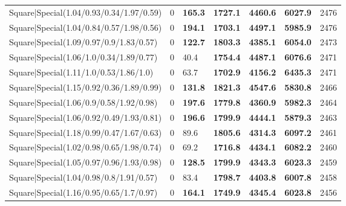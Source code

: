 \begin{tabular}{lrllllr}
 Square|Special(1.04/0.93/0.34/1.97/0.59)                      &             0   & \textbf{165.3} & \textbf{1727.1} & \textbf{4460.6} & \textbf{6027.9} &         2476 \\
 Square|Special(1.04/0.84/0.57/1.98/0.56)                      &             0   & \textbf{194.1} & \textbf{1703.1} & \textbf{4497.1} & \textbf{5985.9} &         2476 \\
 Square|Special(1.09/0.97/0.9/1.83/0.57)                       &             0   & \textbf{122.7} & \textbf{1803.3} & \textbf{4385.1} & \textbf{6054.0} &         2473 \\
 Square|Special(1.06/1.0/0.34/1.89/0.77)                       &             0   & 40.4           & \textbf{1754.4} & \textbf{4487.1} & \textbf{6076.6} &         2471 \\
 Square|Special(1.11/1.0/0.53/1.86/1.0)                        &             0   & 63.7           & \textbf{1702.9} & \textbf{4156.2} & \textbf{6435.3} &         2471 \\
 Square|Special(1.15/0.92/0.36/1.89/0.99)                      &             0   & \textbf{131.8} & \textbf{1821.3} & \textbf{4547.6} & \textbf{5830.8} &         2466 \\
 Square|Special(1.06/0.9/0.58/1.92/0.98)                       &             0   & \textbf{197.6} & \textbf{1779.8} & \textbf{4360.9} & \textbf{5982.3} &         2464 \\
 Square|Special(1.06/0.92/0.49/1.93/0.81)                      &             0   & \textbf{196.6} & \textbf{1799.9} & \textbf{4444.1} & \textbf{5879.3} &         2463 \\
 Square|Special(1.18/0.99/0.47/1.67/0.63)                      &             0   & 89.6           & \textbf{1805.6} & \textbf{4314.3} & \textbf{6097.2} &         2461 \\
 Square|Special(1.02/0.98/0.65/1.98/0.74)                      &             0   & 69.2           & \textbf{1716.8} & \textbf{4434.1} & \textbf{6082.2} &         2460 \\
 Square|Special(1.05/0.97/0.96/1.93/0.98)                      &             0   & \textbf{128.5} & \textbf{1799.9} & \textbf{4343.3} & \textbf{6023.3} &         2459 \\
 Square|Special(1.04/0.98/0.8/1.91/0.57)                       &             0   & 83.4           & \textbf{1798.7} & \textbf{4403.8} & \textbf{6007.8} &         2458 \\
 Square|Special(1.16/0.95/0.65/1.7/0.97)                       &             0   & \textbf{164.1} & \textbf{1749.9} & \textbf{4345.4} & \textbf{6023.8} &         2456 \\

\end{tabular}
